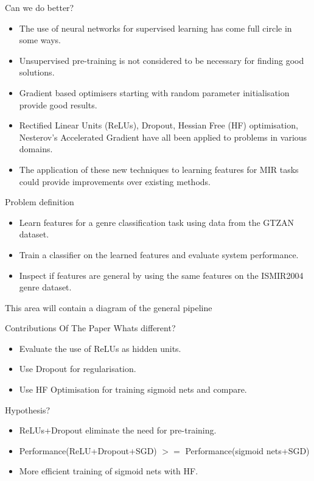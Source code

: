 \documentclass{beamer}
\begin{document}
\begin{frame}{Can we do better?}
  \begin{itemize}
    \item The use of neural networks for supervised learning has come full circle in some ways.
    \item Unsupervised pre-training is not considered to be necessary for finding good solutions. 
    \item Gradient based optimisers starting with random parameter initialisation provide good results. 
    \item Rectified Linear Units (ReLUs), Dropout, Hessian Free (HF) optimisation, Nesterov's Accelerated Gradient have all been applied to problems in various domains.
    \item The application of these new techniques to learning features for MIR tasks could provide improvements over existing methods.  
  \end{itemize}
\end{frame}

\begin{frame}{Problem definition}
  \begin{itemize}
    \item Learn features for a genre classification task using data from the GTZAN dataset.
    \item Train a classifier on the learned features and evaluate system performance.
    \item Inspect if features are general by using the same features on the ISMIR2004 genre dataset. 
  \end{itemize}
  This area will contain a diagram of the general pipeline
\end{frame}

\begin{frame}{Contributions Of The Paper}
{ Whats different?}
\begin{itemize}
    \item Evaluate the use of ReLUs as hidden units.
    \item Use Dropout for regularisation.
    \item Use HF Optimisation for training sigmoid nets and compare. 
  \end{itemize}
{ Hypothesis?}
\begin{itemize}
    \item ReLUs+Dropout eliminate the need for pre-training.
    \item Performance(ReLU+Dropout+SGD) $>=$ Performance(sigmoid nets+SGD)
    \item More efficient training of sigmoid nets with HF.
  \end{itemize}
\end{frame}
\end{document}
